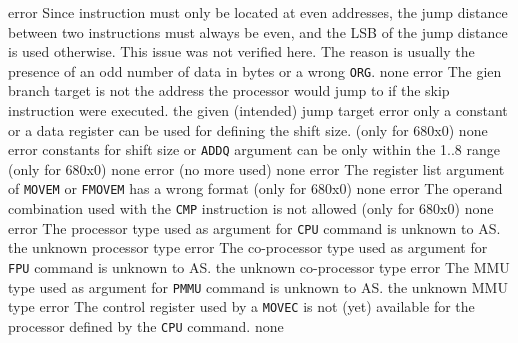 \documentclass[12pt,twoside]{report}
\newcommand{\tty}[1]{{\tt #1}}
\begin{document}
\begin{description}
               {error}
               {Since instruction must only be located at even addresses,
                the jump distance between two instructions must always be
                even, and the LSB of the jump distance is used otherwise.
                This issue was not verified here. The reason is usually the
                presence of an odd number of data in bytes or a wrong
                \tty{ORG}.}
               {none}
               {error}
               {The gien branch target is not the address the processor would
                jump to if the skip instruction were executed.}
               {the given (intended) jump target}
               {error}
               {only a constant or a data register can be used for defining
                the shift size. (only for 680x0)}
               {none}
               {error}
               {constants for shift size or \tty{ADDQ} argument can be only
                within the 1..8 range (only for 680x0)}
               {none}
               {error}
               {(no more used)}
               {none}
               {error}
               {The register list argument of \tty{MOVEM} or \tty{FMOVEM} has a
                wrong format (only for 680x0)}
               {none}
               {error}
               {The operand combination used with the \tty{CMP} instruction is
                not allowed (only for 680x0)}
               {none}
               {error}
               {The processor type used as argument for \tty{CPU} command is
                unknown to AS.}
               {the unknown processor type}
               {error}
               {The co-processor type used as argument for \tty{FPU} command is
                unknown to AS.}
               {the unknown co-processor type}
               {error}
               {The MMU type used as argument for \tty{PMMU} command is
                unknown to AS.}
               {the unknown MMU type}
               {error}
               {The control register used by a \tty{MOVEC} is not (yet) available
                for the processor defined by the \tty{CPU} command.}
               {none}

\end{description}
\end{document}
